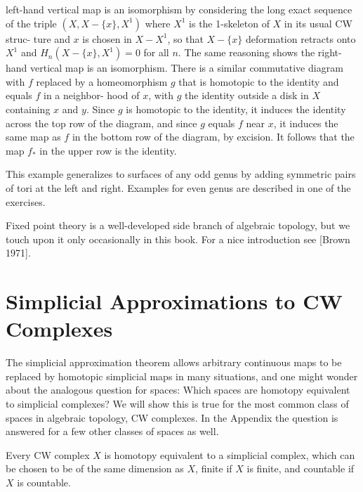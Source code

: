 left-hand vertical map is an isomorphism by considering the long exact sequence of
the triple $(X, X - \{x\}, X^1)$ where $X^1$ is the 1-skeleton of $X$ in its usual CW struc-
ture and $x$ is chosen in $X - X^1$, so that $X - \{x\}$ deformation retracts onto $X^1$ and
$H_n(X - \{x\}, X^1) = 0$ for all $n$. The same reasoning shows the right-hand vertical
map is an isomorphism. There is a similar commutative diagram with $f$ replaced by
a homeomorphism $g$ that is homotopic to the identity and equals $f$ in a neighbor-
hood of $x$, with $g$ the identity outside a disk in $X$ containing $x$ and $y$. Since $g$ is
homotopic to the identity, it induces the identity across the top row of the diagram,
and since $g$ equals $f$ near $x$, it induces the same map as $f$ in the bottom row of the
diagram, by excision. It follows that the map $f_*$ in the upper row is the identity.

This example generalizes to surfaces of any odd genus by adding symmetric pairs
of tori at the left and right. Examples for even genus are described in one of the
exercises.

Fixed point theory is a well-developed side branch of algebraic topology, but we
touch upon it only occasionally in this book. For a nice introduction see [Brown 1971].

\section{Simplicial Approximations to CW Complexes}

The simplicial approximation theorem allows arbitrary continuous maps to be
replaced by homotopic simplicial maps in many situations, and one might wonder
about the analogous question for spaces: Which spaces are homotopy equivalent to
simplicial complexes? We will show this is true for the most common class of spaces
in algebraic topology, CW complexes. In the Appendix the question is answered for a
few other classes of spaces as well.

\begin{theorem}
\label{thm:cw-homotopy-equivalent-simplicial}
Every CW complex $X$ is homotopy equivalent to a simplicial complex,
which can be chosen to be of the same dimension as $X$, finite if $X$ is finite, and
countable if $X$ is countable.
\end{theorem}

